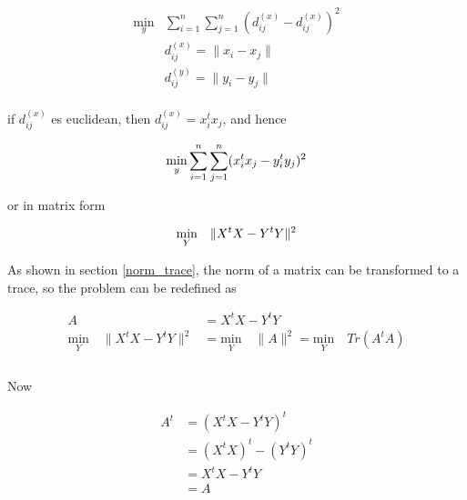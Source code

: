 \documentclass{article}
\begin{document}
    \begin{equation*}
        \begin{aligned}
            \underset{y}{\text{min}}  & \sum_{i=1}^n \sum_{j=1}^n ( d^{(x)}_{ij} - d^{(x)}_{ij} )^2 \\
            & d_{ij}^{(x)} = \lVert x_i - x_j \rVert\\
            & d_{ij}^{(y)} = \lVert y_i - y_j \rVert
        \end{aligned}
    \end{equation*}\\

    if $d_{ij}^{(x)}$ es euclidean, then $d_{ij}^{(x)} = x_i^t x_j$, and hence

    \begin{equation*}
        \underset{y}{\text{min}} \sum_{i=1}^n \sum_{j=1}^n ( x_i^t x_j - y_i^t y_j )^2 \\
    \end{equation*}

    or in matrix form

    \begin{equation*}
        \underset{Y}{\text{min}} \quad \lVert X^t X - Y^t Y \rVert^2 \\
    \end{equation*}

    As shown in section \ref{norm_trace}, the norm of a matrix can be transformed
    to a trace, so the problem can be redefined as

    \begin{equation*}
        \begin{aligned}
            A &= X^tX - Y^tY\\
            \underset{Y}{\text{min}} \quad \lVert X^t X - Y^t Y \rVert^2
            &=
            \underset{Y}{\text{min}} \quad \lVert A \rVert^2
            =
            \underset{Y}{\text{min}} \quad Tr(A^tA) \\
        \end{aligned}
    \end{equation*}\\

    Now

    \begin{equation*}
        \begin{aligned}
            A^t &= (X^tX - Y^tY)^t\\
                &= (X^tX)^t - (Y^tY)^t\\
                &= X^tX - Y^tY\\
                &= A
        \end{aligned}
    \end{equation*}
\end{document}
